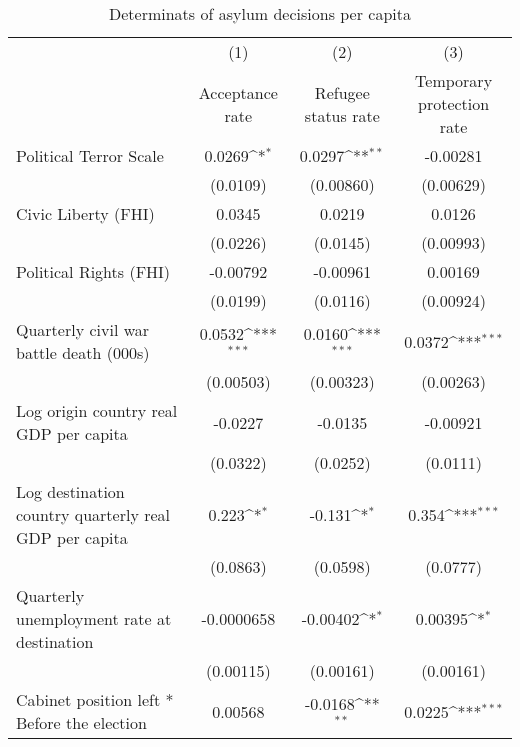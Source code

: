 \begin{table}[htbp]\centering
\def\sym#1{\ifmmode^{#1}\else\(^{#1}\)\fi}
\caption{Determinats of asylum decisions per capita}
\begin{tabular}{l*{3}{c}}
\hline\hline
                    &\multicolumn{1}{c}{(1)}&\multicolumn{1}{c}{(2)}&\multicolumn{1}{c}{(3)}\\
                    &\multicolumn{1}{c}{Acceptance rate}&\multicolumn{1}{c}{Refugee status rate}&\multicolumn{1}{c}{Temporary protection rate}\\
\hline
Political Terror Scale&      0.0269\sym{*}  &      0.0297\sym{**} &    -0.00281         \\
                    &    (0.0109)         &   (0.00860)         &   (0.00629)         \\
[1em]
Civic Liberty (FHI) &      0.0345         &      0.0219         &      0.0126         \\
                    &    (0.0226)         &    (0.0145)         &   (0.00993)         \\
[1em]
Political Rights (FHI)&    -0.00792         &    -0.00961         &     0.00169         \\
                    &    (0.0199)         &    (0.0116)         &   (0.00924)         \\
[1em]
Quarterly civil war battle death (000s)&      0.0532\sym{***}&      0.0160\sym{***}&      0.0372\sym{***}\\
                    &   (0.00503)         &   (0.00323)         &   (0.00263)         \\
[1em]
Log origin country real GDP per capita&     -0.0227         &     -0.0135         &    -0.00921         \\
                    &    (0.0322)         &    (0.0252)         &    (0.0111)         \\
[1em]
Log destination country quarterly real GDP per capita&       0.223\sym{*}  &      -0.131\sym{*}  &       0.354\sym{***}\\
                    &    (0.0863)         &    (0.0598)         &    (0.0777)         \\
[1em]
Quarterly unemployment rate at destination&  -0.0000658         &    -0.00402\sym{*}  &     0.00395\sym{*}  \\
                    &   (0.00115)         &   (0.00161)         &   (0.00161)         \\
[1em]
Cabinet position left * Before the election&     0.00568         &     -0.0168\sym{**} &      0.0225\sym{***}\\

\end{tabular}
\end{table}

